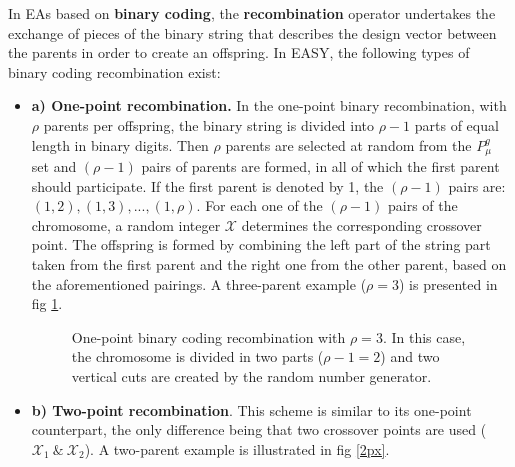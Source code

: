 In EAs based on {\bf binary coding}, the {\bf recombination} operator undertakes the exchange of pieces of the binary string that describes the design vector between the parents in order to create an offspring. In EASY, the following types of binary coding recombination exist:
\begin{itemize}
\item[]{\bf a) One-point recombination.} 
In the one-point binary recombination, with $\rho$ parents per offspring, the binary string is divided into $\rho-1$ parts of equal length in binary digits. Then $\rho$ parents are selected at random from the $P_{\mu}^{g}$ set and $(\rho-1)$ pairs of parents are formed, in all of which the first parent should participate. If the first parent is denoted by 1, the $(\rho-1)$ pairs are: $(1,2),(1,3),...,(1,\rho)$. 
For each one of the $(\rho-1)$ pairs of the chromosome, a random integer $\mathcal{X}$ determines the corresponding crossover point. The offspring is formed by combining the left part of the string part taken from the first parent and the right one from the other parent, based on the aforementioned pairings. A three-parent example ($\rho=3$) is presented in fig \ref{1px}.
\begin{figure}[h!]
\begin{minipage}[b]{1.0\linewidth}
 \centering
\end{minipage}
\caption{One-point binary coding recombination with $\rho=3$. In this case, the chromosome is divided in two parts ($\rho-1 = 2$) and two vertical cuts are created by the random number generator.} 
\label{1px}
\end{figure}

\item[]{\bf b) Two-point recombination}. This scheme is similar to its one-point counterpart, the only difference being that two crossover points are used ($\mathcal{X}_1~\&~\mathcal{X}_2$). A two-parent example is illustrated in fig \ref{2px}.


\end{itemize}
